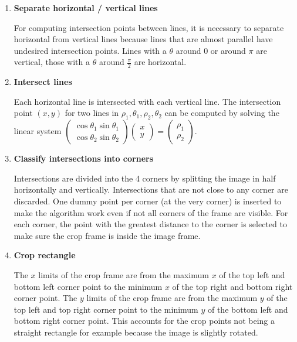 \documentclass{article}
\begin{document}
\begin{enumerate}
\item {\bf Separate horizontal / vertical lines}

For computing intersection points between lines, it is necessary to separate
horizontal from vertical lines because lines that are almost parallel have
undesired intersection points. Lines with a $\theta$ around 0 or around $\pi$
are vertical, those with a $\theta$ around $\frac{\pi}{2}$ are horizontal.

\item {\bf Intersect lines}

Each horizontal line is intersected with each vertical line.
The intersection point $(x, y)$ for two lines in $\rho_1, \theta_1, \rho_2, \theta_2$
can be computed by solving the linear system
$\begin{pmatrix} \cos \theta_1 \sin \theta_1 \\ \cos \theta_2 \sin \theta_2 \end{pmatrix}
\begin{pmatrix} x \\ y \end{pmatrix} = \begin{pmatrix} \rho_1 \\ \rho_2 \end{pmatrix}$.

\item {\bf Classify intersections into corners}

Intersections are divided into the 4 corners by splitting the image in half
horizontally and vertically. Intersections that are not close to any corner are discarded.
One dummy point per corner (at the very corner) is inserted to make the algorithm
work even if not all corners of the frame are visible.
For each corner, the point with the greatest distance to the corner is selected
to make sure the crop frame is inside the image frame.

\item {\bf Crop rectangle}

The $x$ limits of the crop frame are from the maximum $x$ of the top left and bottom left
corner point to the minimum $x$ of the top right and bottom right corner point.
The $y$ limits of the crop frame are from the maximum $y$ of the top left and top right
corner point to the minimum $y$ of the bottom left and bottom right corner point.
This accounts for the crop points not being a straight rectangle for example because
the image is slightly rotated.

\end{enumerate}
\end{document}
